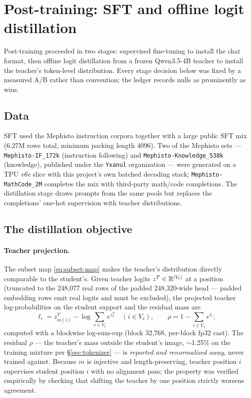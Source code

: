 \section{Post-training: SFT and offline logit distillation}
\label{sec:posttraining}

Post-training proceeded in two stages: supervised fine-tuning to install
the chat format, then offline logit distillation from a frozen
Qwen3.5-4B teacher to install the teacher's token-level distribution.
Every stage decision below was fixed by a measured A/B rather than
convention; the ledger records nulls as prominently as wins.

\subsection{Data}

SFT used the Mephisto instruction corpora together with a large public
SFT mix (6.27M rows total, minimum packing length 4096). Two of the
Mephisto sets --- \texttt{Mephisto-IF\_172k} (instruction following) and
\texttt{Mephisto-Knowledge\_538k} (knowledge), published under the
\texttt{Yxanul} organization --- were generated on a TPU \emph{v6e}
slice with this project's own batched decoding stack;
\texttt{Mephisto-MathCode\_2M} completes the mix with third-party
math/code completions. The distillation stage draws prompts from the
same pools but replaces the completions' one-hot supervision with
teacher distributions.

\subsection{The distillation objective}

\paragraph{Teacher projection.} The subset map \eqref{eq:subset-map}
makes the teacher's distribution directly comparable to the student's.
Given teacher logits $z^{T} \in \mathbb{R}^{|V_t|}$ at a position (truncated to
the 248{,}077 real rows of the padded 248{,}320-wide head --- padded
embedding rows emit real logits and must be excluded), the projected
teacher log-probabilities on the student support and the residual mass
are
\begin{equation}
\ell_i = z^{T}_{m(i)} - \log\!\!\sum_{v \in V_t}\!\! e^{z^{T}_v}
\quad (i \in V_s),
\qquad
\rho = 1 - \sum_{i \in V_s} e^{\ell_i},
\label{eq:projection}
\end{equation}
computed with a blockwise log-sum-exp (block 32{,}768, per-block fp32
cast). The residual $\rho$ --- the teacher's mass outside the student's
image, $\sim$1.25\% on the training mixture per
\S\ref{sec:tokenizer} --- is \emph{reported and renormalized away},
never trained against. Because $m$ is injective and length-preserving,
teacher position $i$ supervises student position $i$ with no alignment
pass; the property was verified empirically by checking that shifting
the teacher by one position strictly worsens agreement.

